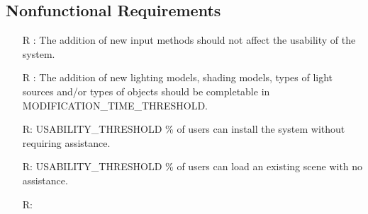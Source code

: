 \documentclass[12pt]{article}
\newcounter{reqnum} %
\begin{document}
\subsection{Nonfunctional Requirements}
\noindent 
\begin{itemize}	
	\item[R\refstepcounter{reqnum}\thereqnum 
	\label{NFR-Productivity-InputMods}:] 
	The addition of new input methods should not affect the usability of the 
	system.
	\item[R\refstepcounter{reqnum}\thereqnum 
	\label{NFR-Productivity-Modifications}:] 
	The addition of new lighting models, shading models, types of light sources 
	and/or types of objects should be completable in 
	MODIFICATION\_TIME\_THRESHOLD.
	\item[R\refstepcounter{reqnum}\thereqnum \label{NFR-Usability-Install}:] 
	USABILITY\_THRESHOLD \% of users can install the system without requiring 
	assistance.
	\item[R\refstepcounter{reqnum}\thereqnum \label{NFR-Usability-load}:] 
	USABILITY\_THRESHOLD \% of users can load an existing scene with no 
	assistance.
	\item[R\refstepcounter{reqnum}\thereqnum \label{NFR-Usability-changes}:] 

\end{itemize}
\end{document}
